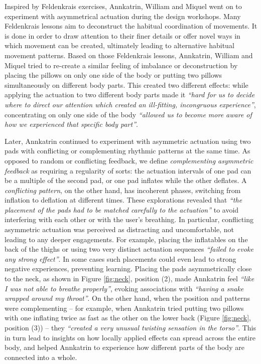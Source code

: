 Inspired by Feldenkrais exercises, Annkatrin, William and Miquel went on to experiment with asymmetrical actuation during the design workshops. Many Feldenkrais lessons aim to deconstruct the habitual coordination of movements. It is done in order to draw attention to their finer details or offer novel ways in which movement can be created, ultimately leading to alternative habitual movement patterns. Based on those Feldenkrais lessons, Annkatrin, William and Miquel tried to re-create a similar feeling of imbalance or deconstruction by placing the pillows on only one side of the body or putting two pillows simultaneously on different body parts. This created two different effects: while applying the actuation to two different body parts made it \textit{``hard for us to decide where to direct our attention which created an ill-fitting, incongruous experience''}, concentrating on only one side of the body \textit{``allowed us to become more aware of how we experienced that specific body part''}.

Later, Annkatrin continued to experiment with asymmetric actuation using two pads with conflicting or complementing rhythmic patterns at the same time. As opposed to random or conflicting feedback, we define \textit{complementing asymmetric feedback} as requiring a regularity of sorts: the actuation intervals of one pad can be a multiple of the second pad, or one pad inflates while the other deflates. A \textit{conflicting pattern}, on the other hand, has incoherent phases, switching from inflation to deflation at different times. These explorations revealed that \textit{``the placement of the pads had to be matched carefully to the actuation''} to avoid interfering with each other or with the user's breathing. In particular, conflicting asymmetric actuation was perceived as distracting and uncomfortable, not leading to any deeper engagements. For example, placing the inflatables on the back of the thighs or using two very distinct actuation sequences \textit{``failed to evoke any strong effect''}. In some cases such placements could even lead to strong negative experiences, preventing learning. Placing the pads asymmetrically close to the neck, as shown in Figure \ref{fig:neck}, position (2), made Annkatrin feel \textit{``like I was not able to breathe properly''}, evoking associations with \textit{``having a snake wrapped around my throat''}. On the other hand, when the position and patterns were complementing -- for example, when Annkatrin tried putting two pillows with one inflating twice as fast as the other on the lower back (Figure \ref{fig:neck}, position (3)) -- they \textit{``created a very unusual twisting sensation in the torso''}. This in turn lead to insights on how locally applied effects can spread across the entire body, and helped Annkatrin to experience how different parts of the body are connected into a whole.

